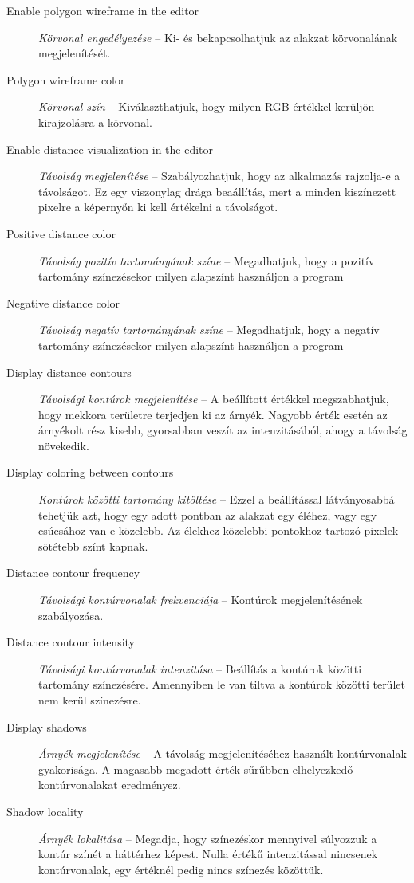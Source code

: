 \begin{description}
    \item[Enable polygon wireframe in the editor] \textit{Körvonal engedélyezése} -- Ki- és bekapcsolhatjuk az alakzat körvonalának megjelenítését.
    \item[Polygon wireframe color] \textit{Körvonal szín} -- Kiválaszthatjuk, hogy milyen RGB értékkel kerüljön kirajzolásra a körvonal.
    \item[Enable distance visualization in the editor] \textit{Távolság megjelenítése} -- Szabályozhatjuk, hogy az alkalmazás rajzolja-e a távolságot. Ez egy viszonylag drága beaállítás, mert a minden kiszínezett pixelre a képernyőn ki kell értékelni a távolságot.
    \item[Positive distance color] \textit{Távolság pozitív tartományának színe} -- Megadhatjuk, hogy a pozitív tartomány színezésekor milyen alapszínt használjon a program
    \item[Negative distance color] \textit{Távolság negatív tartományának színe} -- Megadhatjuk, hogy a negatív tartomány színezésekor milyen alapszínt használjon a program
    \item[Display distance contours] \textit{Távolsági kontúrok megjelenítése} -- A beállított értékkel megszabhatjuk, hogy mekkora területre terjedjen ki az árnyék. Nagyobb érték esetén az árnyékolt rész kisebb, gyorsabban veszít az intenzitásából, ahogy a távolság növekedik.
    \item[Display coloring between contours] \textit{Kontúrok közötti tartomány kitöltése} -- Ezzel a beállítással látványosabbá tehetjük azt, hogy egy adott pontban az alakzat egy éléhez, vagy egy csúcsához van-e közelebb. Az élekhez közelebbi pontokhoz tartozó pixelek sötétebb színt kapnak.
    \item[Distance contour frequency] \textit{Távolsági kontúrvonalak frekvenciája} -- Kontúrok megjelenítésének szabályozása.
    \item[Distance contour intensity] \textit{Távolsági kontúrvonalak intenzitása} -- Beállítás a kontúrok közötti tartomány színezésére. Amennyiben le van tiltva a kontúrok közötti terület nem kerül színezésre.
    \item[Display shadows] \textit{Árnyék megjelenítése} -- A távolság megjelenítéséhez használt kontúrvonalak gyakorisága. A magasabb megadott érték sűrűbben elhelyezkedő kontúrvonalakat eredményez.
    \item[Shadow locality] \textit{Árnyék lokalitása} -- Megadja, hogy színezéskor mennyivel súlyozzuk a kontúr színét a háttérhez képest. Nulla értékű intenzitással nincsenek kontúrvonalak, egy értéknél pedig nincs színezés közöttük.

\end{description}
